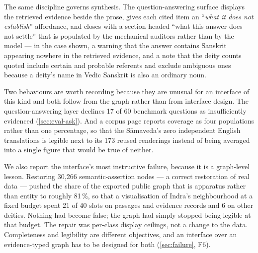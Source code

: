 The same discipline governs synthesis. The question-answering surface displays the
retrieved evidence beside the prose, gives each cited item an
``\emph{what it does not establish}'' affordance, and closes with a section headed
``what this answer does not settle'' that is populated by the mechanical auditors
rather than by the model --- in the case shown, a warning that the answer contains
Sanskrit appearing nowhere in the retrieved evidence, and a note that the deity
counts quoted include certain and probable referents and exclude ambiguous ones
because a deity's name in Vedic Sanskrit is also an ordinary noun.

Two behaviours are worth recording because they are unusual for an interface of this
kind and both follow from the graph rather than from interface design. The
question-answering layer declines 17 of 60 benchmark questions as insufficiently
evidenced (\cref{sec:eval-ask}). And a corpus page reports coverage as four
populations rather than one percentage, so that the S\=amaveda's zero independent
English translations is legible next to its 173 reused renderings instead of being
averaged into a single figure that would be true of neither.

We also report the interface's most instructive failure, because it is a
graph-level lesson. Restoring 30{,}266 semantic-assertion nodes --- a correct
restoration of real data --- pushed the share of the exported public graph that is
apparatus rather than entity to roughly 81\,\%, so that a visualisation of Indra's
neighbourhood at a fixed budget spent 21 of 40 slots on passages and evidence
records and 6 on other deities. Nothing had become false; the graph had simply
stopped being legible at that budget. The repair was per-class display ceilings, not
a change to the data. Completeness and legibility are different objectives, and an
interface over an evidence-typed graph has to be designed for both
(\cref{sec:failure}, F6).
